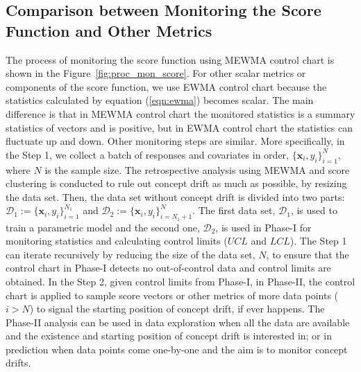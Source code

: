 \documentclass[twoside,11pt]{article}
\begin{document}
\subsection{Comparison between Monitoring the Score Function and Other Metrics}
\label{ss:comp_other_metrics}
The process of monitoring the score function using MEWMA control chart is shown in the Figure~\ref{fig:proc_mon_score}. For other scalar metrics or components of the score function, we use EWMA control chart because the statistics calculated by equation (\ref{eqn:ewma}) becomes scalar. The main difference is that in MEWMA control chart the monitored statistics is a summary statistics of vectors and is positive, but in EWMA control chart the statistics can fluctuate up and down. Other monitoring steps are similar. More specifically, in the Step 1, we collect a batch of responses and covariates in order, $\{\bm {x}_i, y_i\} _{i=1} ^{N}$, where $N$ is the sample size. The retrospective analysis using MEWMA and score clustering is conducted to rule out concept drift as much as possible, by resizing the data set. Then, the data set without concept drift is divided into two parts: $ \mathcal{D}_1 := \{\bm {x}_i, y_i\} _{i=1} ^{N_1}$ and $\mathcal{D}_2 := \{\bm {x}_i, y_i\} _{i=N_1+1} ^{N}$. The first data set, $\mathcal{D}_1$, is used to train a parametric model and the second one, $\mathcal{D}_2$, is used in Phase-I for monitoring statistics and calculating control limits ($UCL$ and $LCL$). The Step 1 can iterate recursively by reducing the size of the data set, $N$, to ensure that the control chart in Phase-I detects no out-of-control data and control limits are obtained. In the Step 2, given control limits from Phase-I, in Phase-II, the control chart is applied to sample score vectors or other metrics of more data points ($i > N$) to signal the starting position of concept drift, if ever happens. The Phase-II analysis can be used in data exploration when all the data are available and the existence and starting position of concept drift is interested in; or in prediction when data points come one-by-one and the aim is to monitor concept drifts. 
\end{document}
